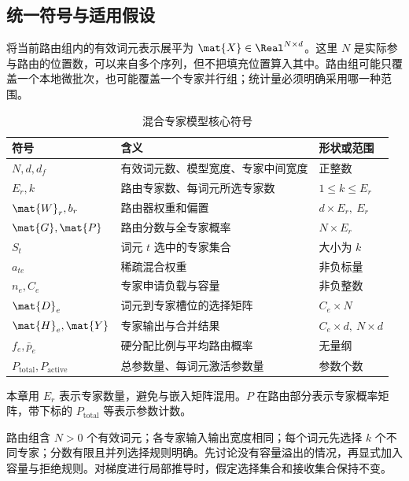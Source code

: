 \documentclass[../textbook.tex]{subfiles}
\begin{document}
\subsection{统一符号与适用假设}
将当前路由组内的有效词元表示展平为 $\mat{X}\in\Real^{N\times d}$。这里 $N$ 是实际参与路由的位置数，可以来自多个序列，但不把填充位置算入其中。路由组可能只覆盖一个本地微批次，也可能覆盖一个专家并行组；统计量必须明确采用哪一种范围。
\begin{table}[htbp]
\centering
\caption{混合专家模型核心符号}\label{tab:moe-symbols}
\begin{tabularx}{\linewidth}{lXl}
\toprule 符号 & 含义 & 形状或范围\\\midrule
$N,d,d_f$ & 有效词元数、模型宽度、专家中间宽度 & 正整数\\
$E_r,k$ & 路由专家数、每词元所选专家数 & $1\le k\le E_r$\\
$\mat{W}_r,b_r$ & 路由器权重和偏置 & $d\times E_r,\ E_r$\\
$\mat{G},\mat{P}$ & 路由分数与全专家概率 & $N\times E_r$\\
$S_t$ & 词元 $t$ 选中的专家集合 & 大小为 $k$\\
$a_{te}$ & 稀疏混合权重 & 非负标量\\
$n_e,C_e$ & 专家申请负载与容量 & 非负整数\\
$\mat{D}_e$ & 词元到专家槽位的选择矩阵 & $C_e\times N$\\
$\mat{H}_e,\mat{Y}$ & 专家输出与合并结果 & $C_e\times d,\ N\times d$\\
$f_e,\bar p_e$ & 硬分配比例与平均路由概率 & 无量纲\\
$P_{\mathrm{total}},P_{\mathrm{active}}$ & 总参数量、每词元激活参数量 & 参数个数\\
\bottomrule
\end{tabularx}
\end{table}
本章用 $E_r$ 表示专家数量，避免与嵌入矩阵混用。$P$ 在路由部分表示专家概率矩阵，带下标的 $P_{\mathrm{total}}$ 等表示参数计数。

\begin{assumption}[基本稀疏路由模型]
路由组含 $N>0$ 个有效词元；各专家输入输出宽度相同；每个词元先选择 $k$ 个不同专家；分数有限且并列选择规则明确。先讨论没有容量溢出的情况，再显式加入容量与拒绝规则。对梯度进行局部推导时，假定选择集合和接收集合保持不变。
\end{assumption}
\end{document}
